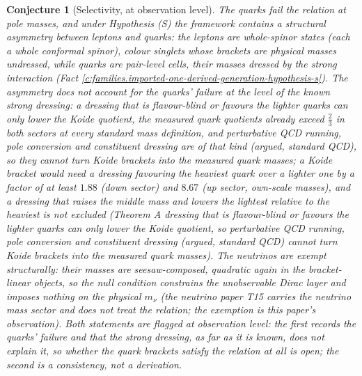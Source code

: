 \documentclass[11pt]{article}
\newtheorem{conjecture}[theorem]{Conjecture}
\theoremstyle{definition}
\theoremstyle{plain}
\newcommand{\changedmark}[2]{\marginpar{\raggedright\scriptsize\color{#1}#2}}
\begin{document}
\begin{conjecture}[Selectivity, at observation level]\label{c:families.selectivity-observation-level}
\changedmark{BrickRed}{corrected since the deposit}
The quarks fail the relation at pole masses, and under Hypothesis (S) the framework contains a structural asymmetry between leptons and quarks: the leptons are whole-spinor states (each a whole conformal spinor), colour singlets whose brackets are physical masses undressed, while quarks are pair-level cells, their masses dressed by the strong interaction (Fact \ref{c:families.imported-one-derived-generation-hypothesis-s}). The asymmetry does not account for the quarks' failure at the level of the known strong dressing: a dressing that is flavour-blind or favours the lighter quarks can only lower the Koide quotient, the measured quark quotients already exceed $\tfrac23$ in both sectors at every standard mass definition, and perturbative QCD running, pole conversion and constituent dressing are of that kind (argued, standard QCD), so they cannot turn Koide brackets into the measured quark masses; a Koide bracket would need a dressing favouring the heaviest quark over a lighter one by a factor of at least $1.88$ (down sector) and $8.67$ (up sector, own-scale masses), and a dressing that raises the middle mass and lowers the lightest relative to the heaviest is not excluded (Theorem \emph{A dressing that is flavour-blind or favours the lighter quarks can only lower the Koide quotient, so perturbative QCD running, pole conversion and constituent dressing (argued, standard QCD) cannot turn Koide brackets into the measured quark masses}). The neutrinos are exempt structurally: their masses are seesaw-composed, quadratic again in the bracket-linear objects, so the null condition constrains the unobservable Dirac layer and imposes nothing on the physical $m_{\nu}$ (the neutrino paper T15 \cite{ButlerT15} carries the neutrino mass sector and does not treat the relation; the exemption is this paper's observation). Both statements are flagged at observation level: the first records the quarks' failure and that the strong dressing, as far as it is known, does not explain it, so whether the quark brackets satisfy the relation at all is open; the second is a consistency, not a derivation.
\end{conjecture}
\end{document}
